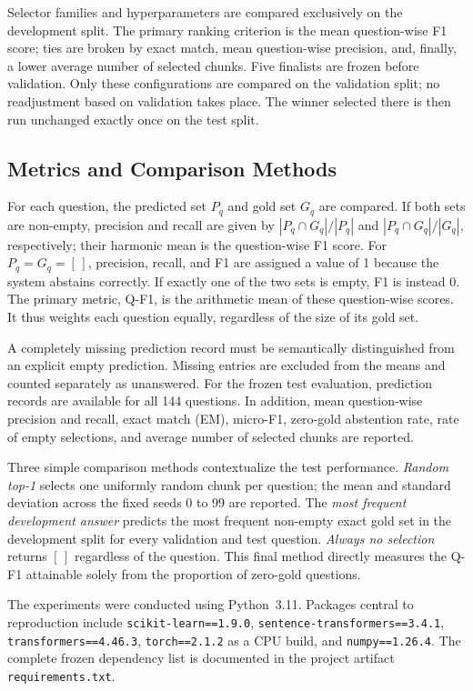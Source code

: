 \documentclass[11pt]{article}
\begin{document}
Selector families and hyperparameters are compared exclusively on the development split. The primary ranking criterion is the mean question-wise F1 score; ties are broken by exact match, mean question-wise precision, and, finally, a lower average number of selected chunks. Five finalists are frozen before validation. Only these configurations are compared on the validation split; no readjustment based on validation takes place. The winner selected there is then run unchanged exactly once on the test split.

\subsection{Metrics and Comparison Methods}

For each question, the predicted set $P_q$ and gold set $G_q$ are compared. If both sets are non-empty, precision and recall are given by $|P_q\cap G_q|/|P_q|$ and $|P_q\cap G_q|/|G_q|$, respectively; their harmonic mean is the question-wise F1 score. For $P_q=G_q=[\,]$, precision, recall, and F1 are assigned a value of 1 because the system abstains correctly. If exactly one of the two sets is empty, F1 is instead 0. The primary metric, Q-F1, is the arithmetic mean of these question-wise scores. It thus weights each question equally, regardless of the size of its gold set.

A completely missing prediction record must be semantically distinguished from an explicit empty prediction. Missing entries are excluded from the means and counted separately as unanswered. For the frozen test evaluation, prediction records are available for all 144 questions. In addition, mean question-wise precision and recall, exact match (EM), micro-F1, zero-gold abstention rate, rate of empty selections, and average number of selected chunks are reported.

Three simple comparison methods contextualize the test performance. \emph{Random top-1} selects one uniformly random chunk per question; the mean and standard deviation across the fixed seeds 0 to 99 are reported. The \emph{most frequent development answer} predicts the most frequent non-empty exact gold set in the development split for every validation and test question. \emph{Always no selection} returns $[\,]$ regardless of the question. This final method directly measures the Q-F1 attainable solely from the proportion of zero-gold questions.

The experiments were conducted using Python~3.11. Packages central to reproduction include \texttt{scikit-learn==1.9.0}, \texttt{sentence-transformers==3.4.1}, \texttt{transformers==4.46.3}, \texttt{torch==2.1.2} as a CPU build, and \texttt{numpy==1.26.4}. The complete frozen dependency list is documented in the project artifact \texttt{requirements.txt}.
\end{document}
